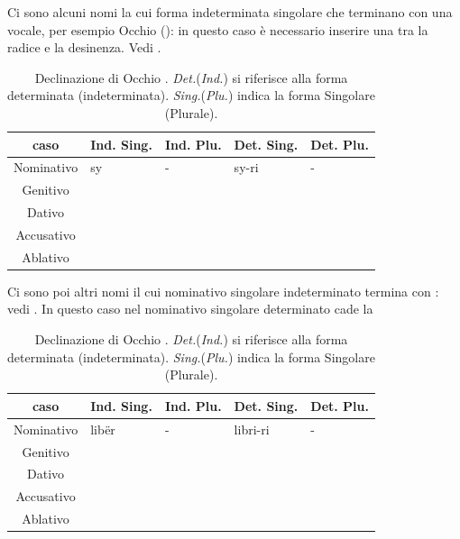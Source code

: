 Ci sono alcuni nomi la cui forma indeterminata singolare che terminano con una vocale, per esempio Occhio (): in questo caso è necessario inserire una  tra la radice e la desinenza. Vedi .


\begin{table}[H]
    \centering
    \begin{tabular}{cllll}
        \toprule
        caso        & Ind. Sing.    & Ind. Plu. & Det. Sing.    & Det. Plu. \\
        \midrule
        Nominativo  & sy            & -      & sy-ri         & - \\
        Genitivo    &          &     &         &  \\
        Dativo      &          &     &         &  \\
        Accusativo  &          &       &         &  \\
        Ablativo    &          &     &         &  \\
        \bottomrule
    \end{tabular}
    \caption{Declinazione di Occhio . \textit{Det.}(\textit{Ind.}) si riferisce alla forma determinata (indeterminata). \textit{Sing.}(\textit{Plu.}) indica la forma Singolare (Plurale)\cite{slide:grammatica}.}
    \label{tbl:sy}
\end{table}

Ci sono poi altri nomi il cui nominativo singolare indeterminato termina con : vedi . In questo caso nel nominativo singolare determinato cade la 

\begin{table}[H]
    \centering
    \begin{tabular}{cllll}
        \toprule
        caso        & Ind. Sing.    & Ind. Plu. & Det. Sing.    & Det. Plu. \\
        \midrule
        Nominativo  & libër            & -      & libri-ri         & - \\
        Genitivo    &          &     &         &  \\
        Dativo      &          &     &         &  \\
        Accusativo  &          &       &         &  \\
        Ablativo    &          &     &         &  \\
        \bottomrule
    \end{tabular}
    \caption{Declinazione di Occhio . \textit{Det.}(\textit{Ind.}) si riferisce alla forma determinata (indeterminata). \textit{Sing.}(\textit{Plu.}) indica la forma Singolare (Plurale)\cite{slide:grammatica}.}
    \label{tbl:liber}
\end{table}

